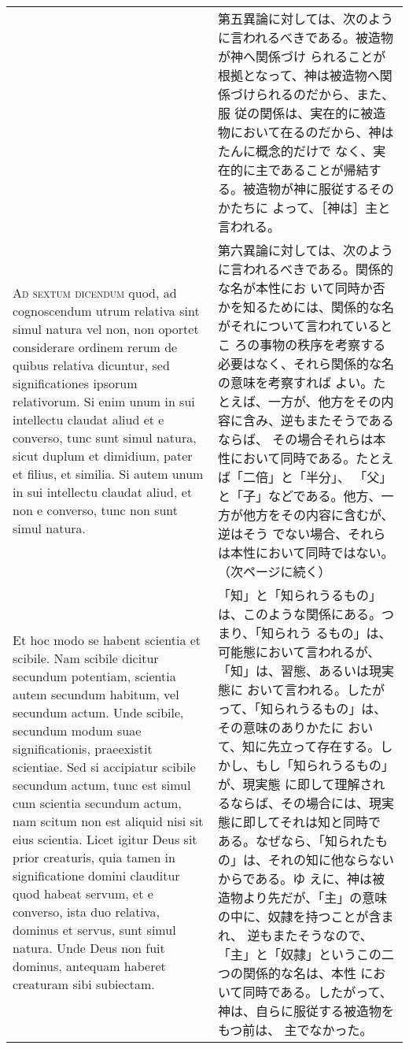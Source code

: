 \documentclass[10pt]{jsarticle}
\begin{document}
\begin{longtable}{p{21em}p{21em}}
&

第五異論に対しては、次のように言われるべきである。被造物が神へ関係づけ
られることが根拠となって、神は被造物へ関係づけられるのだから、また、服
従の関係は、実在的に被造物において在るのだから、神はたんに概念的だけで
なく、実在的に主であることが帰結する。被造物が神に服従するそのかたちに
よって、［神は］主と言われる。

\\

{\scshape Ad sextum dicendum} quod, ad cognoscendum utrum relativa
sint simul natura vel non, non oportet considerare ordinem rerum de
quibus relativa dicuntur, sed significationes ipsorum relativorum. Si
enim unum in sui intellectu claudat aliud et e converso, tunc sunt
simul natura, sicut duplum et dimidium, pater et filius, et
similia. Si autem unum in sui intellectu claudat aliud, et non e
converso, tunc non sunt simul natura.

&

第六異論に対しては、次のように言われるべきである。関係的な名が本性にお
いて同時か否かを知るためには、関係的な名がそれについて言われているとこ
ろの事物の秩序を考察する必要はなく、それら関係的な名の意味を考察すれば
よい。たとえば、一方が、他方をその内容に含み、逆もまたそうであるならば、
その場合それらは本性において同時である。たとえば「二倍」と「半分」、
「父」と「子」などである。他方、一方が他方をその内容に含むが、逆はそう
でない場合、それらは本性において同時ではない。（次ページに続く）

\\

Et hoc modo se habent scientia et scibile. Nam scibile dicitur
secundum potentiam, scientia autem secundum habitum, vel secundum
actum. Unde scibile, secundum modum suae significationis, praeexistit
scientiae. Sed si accipiatur scibile secundum actum, tunc est simul
cum scientia secundum actum, nam scitum non est aliquid nisi sit eius
scientia. Licet igitur Deus sit prior creaturis, quia tamen in
significatione domini clauditur quod habeat servum, et e converso,
ista duo relativa, dominus et servus, sunt simul natura. Unde Deus non
fuit dominus, antequam haberet creaturam sibi subiectam.

&

「知」と「知られうるもの」は、このような関係にある。つまり、「知られう
るもの」は、可能態において言われるが、「知」は、習態、あるいは現実態に
おいて言われる。したがって、「知られうるもの」は、その意味のありかたに
おいて、知に先立って存在する。しかし、もし「知られうるもの」が、現実態
に即して理解されるならば、その場合には、現実態に即してそれは知と同時で
ある。なぜなら、「知られたもの」は、それの知に他ならないからである。ゆ
えに、神は被造物より先だが、「主」の意味の中に、奴隷を持つことが含まれ、
逆もまたそうなので、「主」と「奴隷」というこの二つの関係的な名は、本性
において同時である。したがって、神は、自らに服従する被造物をもつ前は、
主でなかった。

\end{longtable}
\newpage
{}
\end{document}

